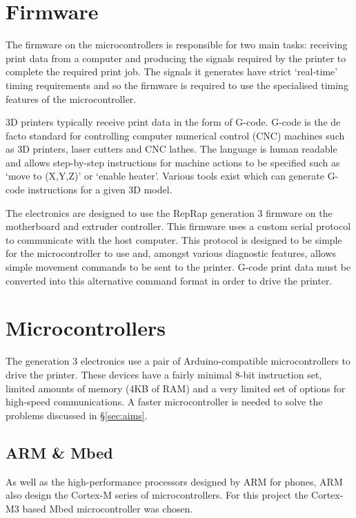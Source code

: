 	\section{Firmware}
		
		The firmware on the microcontrollers is responsible for two main tasks:
		receiving print data from a computer and producing the signals required by
		the printer to complete the required print job. The signals it generates
		have strict `real-time' timing requirements and so the firmware is required
		to use the specialised timing features of the microcontroller.
		
		3D printers typically receive print data in the form of G-code. G-code is
		the de facto standard for controlling computer numerical control (CNC)
		machines such as 3D printers, laser cutters and CNC lathes. The language is
		human readable and allows step-by-step instructions for machine actions to
		be specified such as `move to (X,Y,Z)' or `enable heater'. Various tools
		exist which can generate G-code instructions for a given 3D model.
		
		The electronics are designed to use the RepRap generation 3 firmware on the
		motherboard and extruder controller. This firmware uses a custom serial
		protocol to communicate with the host computer. This protocol is designed to
		be simple for the microcontroller to use and, amongst various diagnostic
		features, allows simple movement commands to be sent to the printer. G-code
		print data must be converted into this alternative command format in order
		to drive the printer.
	
	\section{Microcontrollers}
		
		The generation 3 electronics use a pair of Arduino-compatible
		microcontrollers to drive the printer. These devices have a fairly minimal
		8-bit instruction set, limited amounts of memory (4KB of RAM) and a very
		limited set of options for high-speed communications. A faster
		microcontroller is needed to solve the problems discussed in
		\S\ref{sec:aims}.
		
		\subsection{ARM \& Mbed}
			
			As well as the high-performance processors designed by ARM for phones, ARM
			also design the Cortex-M series of microcontrollers. For this project the
			Cortex-M3 based Mbed microcontroller was chosen.
			

